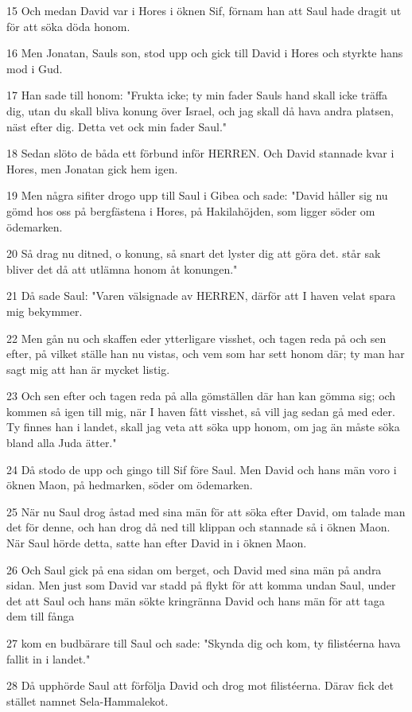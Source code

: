 \par 15 Och medan David var i Hores i öknen Sif, förnam han att Saul hade dragit ut för att söka döda honom.
\par 16 Men Jonatan, Sauls son, stod upp och gick till David i Hores och styrkte hans mod i Gud.
\par 17 Han sade till honom: "Frukta icke; ty min fader Sauls hand skall icke träffa dig, utan du skall bliva konung över Israel, och jag skall då hava andra platsen, näst efter dig. Detta vet ock min fader Saul."
\par 18 Sedan slöto de båda ett förbund inför HERREN. Och David stannade kvar i Hores, men Jonatan gick hem igen.
\par 19 Men några sifiter drogo upp till Saul i Gibea och sade: "David håller sig nu gömd hos oss på bergfästena i Hores, på Hakilahöjden, som ligger söder om ödemarken.
\par 20 Så drag nu ditned, o konung, så snart det lyster dig att göra det. står sak bliver det då att utlämna honom åt konungen."
\par 21 Då sade Saul: "Varen välsignade av HERREN, därför att I haven velat spara mig bekymmer.
\par 22 Men gån nu och skaffen eder ytterligare visshet, och tagen reda på och sen efter, på vilket ställe han nu vistas, och vem som har sett honom där; ty man har sagt mig att han är mycket listig.
\par 23 Och sen efter och tagen reda på alla gömställen där han kan gömma sig; och kommen så igen till mig, när I haven fått visshet, så vill jag sedan gå med eder. Ty finnes han i landet, skall jag veta att söka upp honom, om jag än måste söka bland alla Juda ätter."
\par 24 Då stodo de upp och gingo till Sif före Saul. Men David och hans män voro i öknen Maon, på hedmarken, söder om ödemarken.
\par 25 När nu Saul drog åstad med sina män för att söka efter David, om talade man det för denne, och han drog då ned till klippan och stannade så i öknen Maon. När Saul hörde detta, satte han efter David in i öknen Maon.
\par 26 Och Saul gick på ena sidan om berget, och David med sina män på andra sidan. Men just som David var stadd på flykt för att komma undan Saul, under det att Saul och hans män sökte kringränna David och hans män för att taga dem till fånga
\par 27 kom en budbärare till Saul och sade: "Skynda dig och kom, ty filistéerna hava fallit in i landet."
\par 28 Då upphörde Saul att förfölja David och drog mot filistéerna. Därav fick det stället namnet Sela-Hammalekot.

